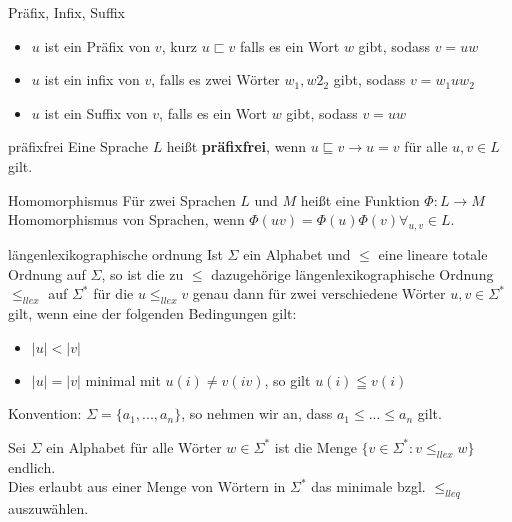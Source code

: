 
\begin{defn}{Präfix, Infix, Suffix}
    \begin{itemize}
        \item $u$ ist ein Präfix von $v$, kurz $u \sqsubset v$ falls es ein Wort $w$ gibt, sodass $v=uw$
        \item $u$ ist ein infix von $v$,  falls es zwei Wörter $w_1,w2_2$ gibt, sodass $v=w_1uw_2$
        \item $u$ ist ein Suffix von $v$, falls es ein Wort $w$ gibt, sodass $v=uw$
    \end{itemize}
\end{defn}

\begin{defn}{präfixfrei}
    Eine Sprache $L$ heißt \textbf{präfixfrei}, wenn $u \sqsubseteq v \rightarrow u = v$ für alle $u,v \in L$ gilt.
\end{defn}

\begin{defn}{Homomorphismus}
    Für zwei Sprachen $L$ und $M$ heißt eine Funktion $\Phi :L\rightarrow M$ Homomorphismus von Sprachen, wenn $\Phi(uv) = \Phi(u)\Phi(v) \forall_{u,v} \in L$.
\end{defn}

\begin{defn}{längenlexikographische ordnung}
    Ist $\Sigma$ ein Alphabet und $\leq$ eine lineare totale Ordnung auf $\Sigma$, so ist die zu $\leq$ dazugehörige längenlexikographische Ordnung $\leq_{llex}$ auf $\Sigma^*$ für die $u \leq_{llex} v$ genau dann für zwei verschiedene Wörter $u,v \in \Sigma^*$ gilt, wenn eine der folgenden Bedingungen gilt:
    \begin{itemize}
        \item $|u| < |v|$ 
        \item $|u| = |v|$ minimal mit $u(i) \neq v(iv)$, so gilt $u(i) \leqq v(i)$
    \end{itemize}
    Konvention: $\Sigma = \{a_1,...,a_n\}$, so nehmen wir an, dass $a_1\leq...\leq a_n$ gilt.
\end{defn}

\begin{bem}
    Sei $\Sigma$ ein Alphabet für alle Wörter $w \in \Sigma^*$ ist die Menge $\{v \in \Sigma^*:v\leq_{llex}w\}$ endlich. \\
    Dies erlaubt aus einer Menge von Wörtern in $\Sigma^*$ das minimale bzgl. $\leq_{lleq}$ auszuwählen.
\end{bem}

